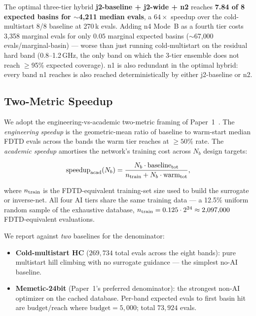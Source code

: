 The optimal three-tier hybrid \textbf{j2-baseline + j2-wide + n2} reaches
\textbf{7.84 of 8 expected basins for $\sim$4{,}211 median evals},
a $64\times$ speedup over the cold-multistart 8/8 baseline at 270\,k
evals. Adding n4 Mode~B as a fourth tier costs 3{,}358 marginal evals
for only $0.05$ marginal expected basins ($\sim$67{,}000
evals/marginal-basin) --- worse than just running cold-multistart on
the residual hard band (0.8--1.2\,GHz, the only band on which the
3-tier ensemble does not reach $\geq$95\% expected coverage). n1 is
also redundant in the optimal hybrid: every band n1 reaches is also
reached deterministically by either j2-baseline or n2.

\subsection{Two-Metric Speedup}

We adopt the engineering-vs-academic two-metric framing of
Paper~1~\cite{Maloney2026Paper1}. The \emph{engineering speedup} is the
geometric-mean ratio of baseline to warm-start median FDTD evals
across the bands the warm tier reaches at $\geq 50\%$ rate. The
\emph{academic speedup} amortises the network's training cost across
$N_b$ design targets:

\begin{equation}
\mathrm{speedup}_{\rm acad}(N_b) =
\frac{N_b \cdot \mathrm{baseline}_{\rm tot}}
     {n_{\rm train} + N_b \cdot \mathrm{warm}_{\rm tot}},
\label{eq:academic_speedup}
\end{equation}

where $n_{\rm train}$ is the FDTD-equivalent training-set size used
to build the surrogate or inverse-net. All four AI tiers share the
same training data --- a 12.5\% uniform random sample of the
exhaustive database, $n_{\rm train} = 0.125 \cdot 2^{24} \approx
2{,}097{,}000$ FDTD-equivalent evaluations.

We report against \emph{two} baselines for the denominator:

\begin{itemize}
\item \textbf{Cold-multistart HC} ($269{,}734$ total evals across the
eight bands): pure multistart hill climbing with no surrogate
guidance --- the simplest no-AI baseline.
\item \textbf{Memetic-24bit} (Paper~1's preferred denominator): the
strongest non-AI optimizer on the cached database. Per-band
expected evals to first basin hit are
$\mathrm{budget}/\mathrm{reach}$ where $\mathrm{budget} = 5{,}000$;
total $73{,}924$ evals.
\end{itemize}


